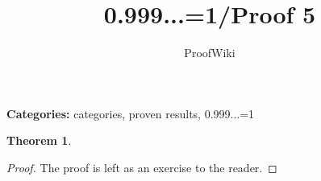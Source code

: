 \documentclass{article}
\title{0.999...=1/Proof 5}
\author{ProofWiki}
\date{}
\newtheorem{theorem}{Theorem}
\begin{document}
\maketitle

\noindent\textbf{Categories:} categories, proven results, 0.999...=1

\begin{theorem}

\end{theorem}

\begin{proof}
The proof is left as an exercise to the reader.
\end{proof}
\end{document}
